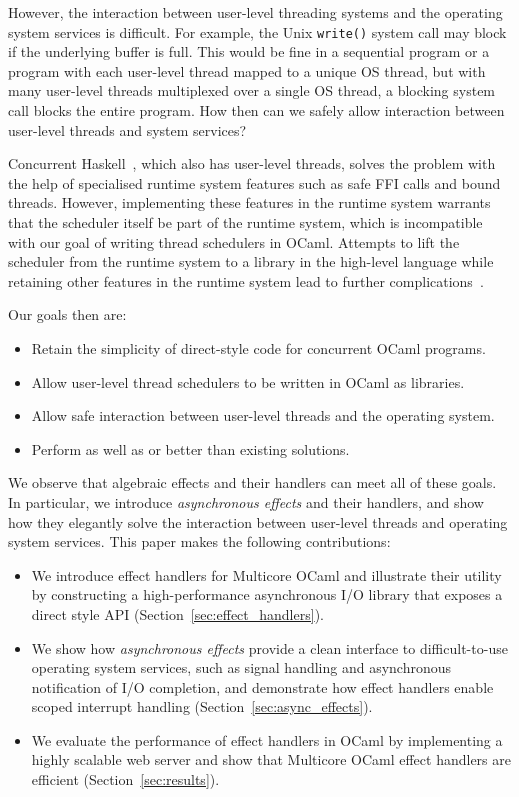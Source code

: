 \documentclass{llncs}
\begin{document}
However, the interaction between user-level threading systems and the operating
system services is difficult. For example, the Unix \texttt{write()} system call
may block if the underlying buffer is full. This would be fine in a
sequential program or a program with each user-level thread mapped to a unique
OS thread, but with many user-level threads multiplexed over a single OS thread, a
blocking system call blocks the entire program. How then can we
safely allow interaction between user-level threads and system services?

Concurrent Haskell~\citep*{MarlowPJT04}, which also has user-level
threads, solves the problem with the help of specialised runtime system
features such as safe FFI calls and bound threads. However, implementing
these features in the runtime system
warrants that the scheduler itself be part of the runtime system, which is
incompatible with our goal of writing thread schedulers in OCaml. Attempts to
lift the scheduler from the runtime system to a library in the high-level
language while retaining other features in the runtime system lead to further
complications~\citep*{KcHMP16}.

\noindent Our goals then are:

\begin{itemize}
	\item Retain the simplicity of direct-style code for concurrent OCaml
		programs.
	\item Allow user-level thread schedulers to be
		written in OCaml as libraries.
	\item Allow safe interaction between user-level threads and the operating system.
	\item Perform as well as or better than existing solutions.
\end{itemize}

We observe that algebraic effects and their handlers can meet all of
these goals. In particular, we introduce \emph{asynchronous effects}
and their handlers, and show how they elegantly solve the interaction
between user-level threads and operating system services. This paper
makes the following contributions:

\begin{itemize}
	\item We introduce effect handlers for Multicore OCaml and illustrate their
		utility by constructing a high-performance asynchronous I/O library that
		exposes a direct style API (Section~\ref{sec:effect_handlers}).
	\item We show how \emph{asynchronous effects} provide a clean interface to
		difficult-to-use operating system services, such as signal handling and
		asynchronous notification of I/O completion, and demonstrate how effect
		handlers enable scoped interrupt handling
		(Section~\ref{sec:async_effects}).
	\item We evaluate the performance of effect handlers in OCaml by implementing
		a highly scalable web server and show that Multicore OCaml effect handlers
		are efficient (Section~\ref{sec:results}).
\end{itemize}
\end{document}
